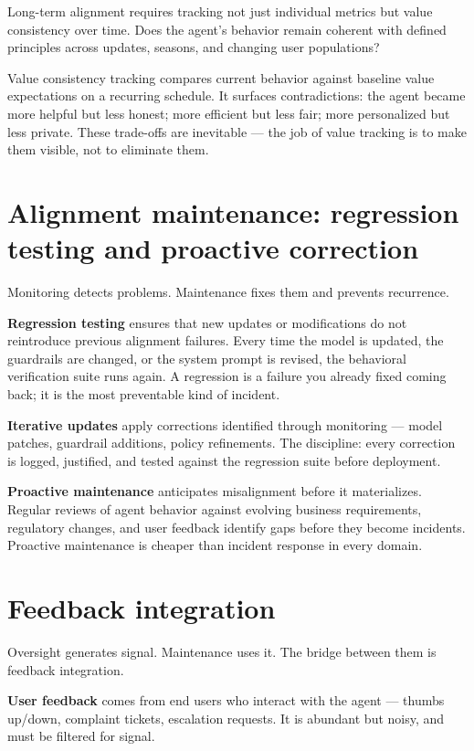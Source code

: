 Long-term alignment requires tracking not just individual metrics but value consistency over time. Does the agent's behavior remain coherent with defined principles across updates, seasons, and changing user populations?

Value consistency tracking compares current behavior against baseline value expectations on a recurring schedule. It surfaces contradictions: the agent became more helpful but less honest; more efficient but less fair; more personalized but less private. These trade-offs are inevitable --- the job of value tracking is to make them visible, not to eliminate them.

\section{Alignment maintenance: regression testing and proactive correction}

Monitoring detects problems. Maintenance fixes them and prevents recurrence.

\textbf{Regression testing} ensures that new updates or modifications do not reintroduce previous alignment failures. Every time the model is updated, the guardrails are changed, or the system prompt is revised, the behavioral verification suite runs again. A regression is a failure you already fixed coming back; it is the most preventable kind of incident.

\textbf{Iterative updates} apply corrections identified through monitoring --- model patches, guardrail additions, policy refinements. The discipline: every correction is logged, justified, and tested against the regression suite before deployment.

\textbf{Proactive maintenance} anticipates misalignment before it materializes. Regular reviews of agent behavior against evolving business requirements, regulatory changes, and user feedback identify gaps before they become incidents. Proactive maintenance is cheaper than incident response in every domain.

\section{Feedback integration}

Oversight generates signal. Maintenance uses it. The bridge between them is feedback integration.

\textbf{User feedback} comes from end users who interact with the agent --- thumbs up/down, complaint tickets, escalation requests. It is abundant but noisy, and must be filtered for signal.

